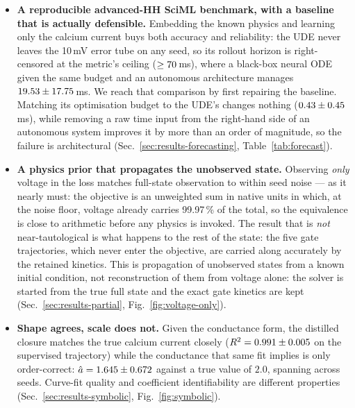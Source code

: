 \documentclass{article}
\newcommand{\Ttube}{10}        %
\newcommand{\gcaMain}{2.0}     %
\newcommand{\LossShareV}{99.97}
\begin{document}
\begin{itemize}
  \item %
  \textbf{A reproducible advanced-HH SciML benchmark, with a baseline that is
  actually defensible.} Embedding the known physics and learning only the calcium
  current buys both accuracy and reliability: the UDE never leaves the \Ttube\,mV
  error tube on any seed, so its rollout horizon is right-censored at the
  metric's ceiling ($\ge 70$\,ms), where a black-box neural
  ODE given the same budget and an autonomous architecture manages
  $19.53 \pm 17.75$\,ms. We reach that comparison by first
  repairing the baseline. Matching its optimisation budget to the UDE's changes
  nothing ($0.43 \pm 0.45$\,ms), while removing a raw time
  input from the right-hand side of an autonomous system improves it by more than
  an order of magnitude, so the failure is architectural
  (Sec.~\ref{sec:results-forecasting}, Table~\ref{tab:forecast}).

  \item %
  \textbf{A physics prior that propagates the unobserved state.} Observing
  \emph{only} voltage in the loss matches full-state observation to within seed
  noise --- as it nearly must: the objective is an unweighted sum in native
  units in which, at the noise floor, voltage already carries \LossShareV\,\% of
  the total, so the
  equivalence is close to arithmetic before any physics is invoked. The result
  that is \emph{not} near-tautological is what happens to the rest of the state:
  the five gate trajectories, which never enter the objective, are
  carried along accurately by the retained kinetics. This is propagation of
  unobserved states from a known initial condition, not reconstruction of them
  from voltage alone: the solver is started from the true full state and the
  exact gate kinetics are kept
  (Sec.~\ref{sec:results-partial}, Fig.~\ref{fig:voltage-only}).

  \item %
  \textbf{Shape agrees, scale does not.} Given the conductance form, the distilled
  closure matches the true calcium current closely
  ($R^2 = 0.991 \pm 0.005$ on the supervised trajectory) while
  the conductance that same fit implies is only order-correct:
  $\hat{a} = 1.645 \pm 0.672$ against a true value of $\gcaMain$,
  spanning \valSymbolicAHatRangeTrajTrain{} across seeds. Curve-fit quality and
  coefficient identifiability are different properties
  (Sec.~\ref{sec:results-symbolic}, Fig.~\ref{fig:symbolic}).


\end{itemize}
\end{document}
